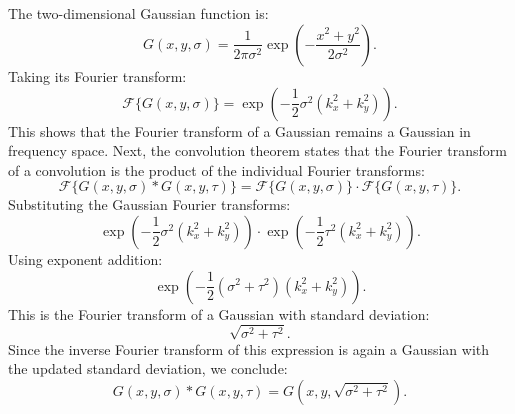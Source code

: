 \documentclass[12pt]{article}
\begin{document}
\subsection{}
The two-dimensional Gaussian function is:
\begin{equation}
    G(x,y,\sigma) = \frac{1}{2\pi\sigma^2} \exp\left(-\frac{x^2 + y^2}{2\sigma^2} \right).
\end{equation}
Taking its Fourier transform:
\begin{equation}
    \mathcal{F} \{ G(x,y,\sigma) \} = \exp\left(-\frac{1}{2} \sigma^2 (k_x^2 + k_y^2) \right).
\end{equation}
This shows that the Fourier transform of a Gaussian remains a Gaussian in frequency space.
Next, the convolution theorem states that the Fourier transform of a convolution is the product of the individual Fourier transforms:
\begin{equation}
    \mathcal{F} \{ G(x,y,\sigma) * G(x,y,\tau) \} = \mathcal{F} \{ G(x,y,\sigma) \} \cdot \mathcal{F} \{ G(x,y,\tau) \}.
\end{equation}
Substituting the Gaussian Fourier transforms:
\begin{equation}
    \exp\left(-\frac{1}{2} \sigma^2 (k_x^2 + k_y^2) \right) \cdot \exp\left(-\frac{1}{2} \tau^2 (k_x^2 + k_y^2) \right).
\end{equation}
Using exponent addition:
\begin{equation}
    \exp\left(-\frac{1}{2} (\sigma^2 + \tau^2) (k_x^2 + k_y^2) \right).
\end{equation}
This is the Fourier transform of a Gaussian with standard deviation:
\begin{equation}
    \sqrt{\sigma^2 + \tau^2}.
\end{equation}
Since the inverse Fourier transform of this expression is again a Gaussian with the updated standard deviation, we conclude:
\begin{equation}
    G(x,y,\sigma) * G(x,y,\tau) = G(x,y,\sqrt{\sigma^2 + \tau^2}).
\end{equation}
\end{document}
